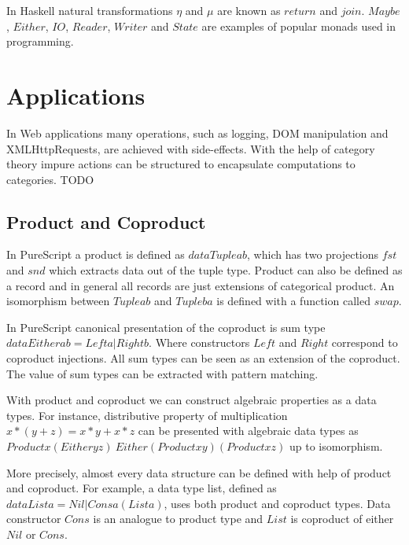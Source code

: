 \documentclass[article]{aaltoseries}
\begin{document}
    In Haskell natural transformations $\eta$ and $\mu$ are known as $return$ and $join$.
    $Maybe$, $Either$, $IO$, $Reader$, $Writer$ and $State$ are examples of popular monads
    used in programming.



\section{Applications}

In Web applications many operations, such as logging, DOM manipulation and
XMLHttpRequests, are achieved with side-effects. With the help of category
theory impure actions can be structured to encapsulate computations to
categories. TODO

  \subsection{Product and Coproduct}
    In PureScript a product is defined as $data Tuple a b$, which has two
    projections $fst$ and $snd$ which extracts data out of the tuple type. Product can
    also be defined as a record and in general all records are just extensions of
    categorical product. An isomorphism between $Tuple a b$ and $Tuple b a$ is defined
    with a function called $swap$.
    
    In PureScript canonical presentation of the coproduct is sum type $data Either a
    b = Left a | Right b$. Where constructors $Left$ and $Right$ correspond to coproduct
    injections. All sum types can be seen as an extension of the coproduct. The
    value of sum types can be extracted with pattern matching.
    
    With product and coproduct we can construct algebraic properties as a data
    types. For instance, distributive property of multiplication $x * (y + z) = x * y
    + x * z$ can be presented with algebraic data types as $Product x (Either y z) ~
    Either (Product x y) (Product x z)$ up to isomorphism.

    More precisely, almost every data structure can be defined with help of product
    and coproduct. For example, a data type list, defined as $data List a = Nil |
    Cons a (List a)$, uses both product and coproduct types. Data constructor $Cons$ is
    an analogue to product type and $List$ is coproduct of either $Nil$ or $Cons$.
\end{document}
